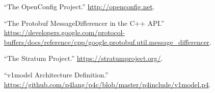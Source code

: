 \documentclass[11pt]{article}
\begin{document}
{{\begin{thebibliography}{45}
\mdbibitemlabel{{}[41]}\textquotedblleft{}The OpenConfig Project.\textquotedblright{} \href{http://openconfig.net}{{\ttfamily http://\hspace{0pt}openconfig.\hspace{0pt}net}}.\label{openconfig}%

\mdbibitemlabel{{}[42]}\textquotedblleft{}The Protobuf MessageDifferencer in the C++ API.\textquotedblright{} \href{https://developers.google.com/protocol-buffers/docs/reference/cpp/google.protobuf.util.message_differencer}{{\ttfamily https://\hspace{0pt}developers.\hspace{0pt}google.\hspace{0pt}com/\hspace{0pt}protocol-\hspace{0pt}buffers/\hspace{0pt}docs/\hspace{0pt}reference/\hspace{0pt}cpp/\hspace{0pt}google.\hspace{0pt}protobuf.\hspace{0pt}util.\hspace{0pt}message\_\hspace{0pt}differencer}}.\label{protomessagedifferencer}%

\mdbibitemlabel{{}[43]}\textquotedblleft{}The Stratum Project.\textquotedblright{} \href{https://stratumproject.org/}{{\ttfamily https://\hspace{0pt}stratumproject.\hspace{0pt}org/\hspace{0pt}}}.\label{stratum}%

\mdbibitemlabel{{}[44]}\textquotedblleft{}v1model Architecture Definition.\textquotedblright{} \href{https://github.com/p4lang/p4c/blob/master/p4include/v1model.p4}{{\ttfamily https://\hspace{0pt}github.\hspace{0pt}com/\hspace{0pt}p4lang/\hspace{0pt}p4c/\hspace{0pt}blob/\hspace{0pt}master/\hspace{0pt}p4include/\hspace{0pt}v1model.\hspace{0pt}p4}}.\label{v1model}%


\end{thebibliography}}}
\end{document}
